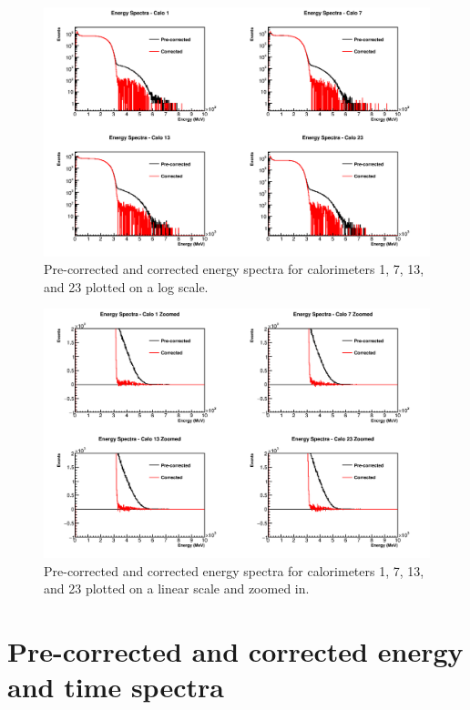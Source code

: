 \begin{figure}[]
	\centering
	\includegraphics[width=\textwidth]{CaloEnergies}
    \caption[CaloEnergies]{Pre-corrected and corrected energy spectra for calorimeters 1, 7, 13, and 23 plotted on a log scale.}    
    \label{fig:CaloEnergies}
\end{figure}

\begin{figure}[]
	\centering
	\includegraphics[width=\textwidth]{CaloEnergiesZoomed}
    \caption[CaloEnergiesZoomed]{Pre-corrected and corrected energy spectra for calorimeters 1, 7, 13, and 23 plotted on a linear scale and zoomed in.}    
    \label{fig:CaloEnergiesZoomed}
\end{figure}

\section{Pre-corrected and corrected energy and time spectra}

